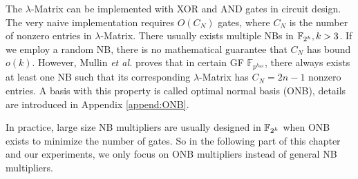 The $\lambda$-Matrix can be implemented with XOR and AND gates in circuit design.
The very naive implementation requires $O(C_N)$ gates, where $C_N$ is the number of
nonzero entries in $\lambda$-Matrix.
There usually exists multiple NBs in ${\mathbb{F}}_{2^k}, k>3$. If we employ a random NB, there is no mathematical
guarantee that $C_N$ has bound $o(k)$. However,
Mullin {\it et al.} \cite{mullinONB} %
proves that in certain GF $\mathbb F_{p^{k_{opt}}}$, there always exists at least one NB such that 
its corresponding $\lambda$-Matrix has $C_N = 2n-1$ nonzero entries. A basis with this property is
called optimal normal basis (ONB), details are introduced in Appendix \ref{append:ONB}.

In practice, large size NB multipliers are usually designed in ${\mathbb{F}}_{2^k}$ when ONB exists
to minimize the number of gates. So in the following part of this chapter and our experiments,
we only focus on ONB multipliers instead of general NB multipliers.


